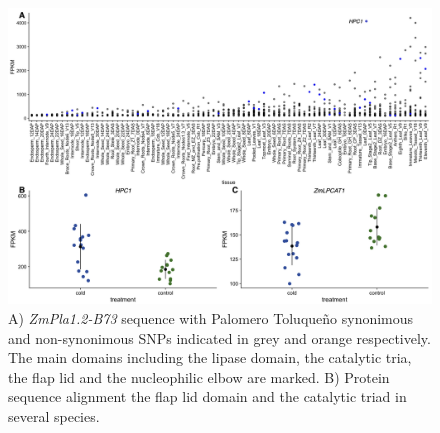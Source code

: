\documentclass[9pt,twocolumn,twoside,lineno]{gsajnl}
\begin{document}
\begin{figure}[t]
\begin{center}
\includegraphics[width=0.8\paperwidth]{Sup_Figures/Sup_Fig_4.png}
\caption{A) \textit{ZmPla1.2-B73} sequence with Palomero Toluqueño synonimous and non-synonimous SNPs indicated in grey and orange respectively. The main domains including the lipase domain, the catalytic tria, the flap lid and the nucleophilic elbow are marked. B) Protein sequence alignment the flap lid domain and the catalytic triad in several species.  
}
\label{SupFig4}
\end{center}
\end{figure}  
\end{document}
